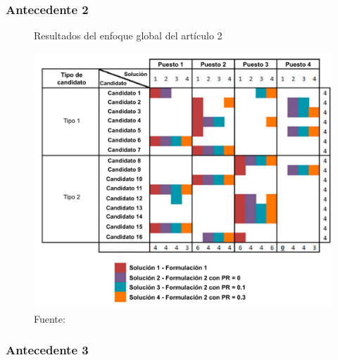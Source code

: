 \subsubsection{Antecedente 2}

\lipsum[2]

\begin{figure}[H]
  \centering
  \caption{Resultados del enfoque global del artículo 2}
  \includegraphics[width=1.0\textwidth]{E_IMAGENES/1_Capitulo2/1-research-background/Paper_2_2.pdf}
  \caption*{Fuente: \citet{PESSACH2020113290}}
  \label{fig:Paper_2_2}
\end{figure}

\subsubsection{Antecedente 3}

\lipsum[3]

